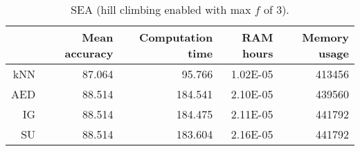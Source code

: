 \begin{table}[h]
\centering
\begin{tabular}{r|rrrr}	
    & Mean accuracy & Computation time & RAM hours & Memory usage \\ \hline
kNN & 87.064                   & 95.766           & 1.02E-05  & 413456       \\
AED & 88.514                   & 184.541          & 2.10E-05  & 439560       \\
IG  & 88.514                   & 184.475          & 2.11E-05  & 441792       \\
SU  & 88.514                   & 183.604          & 2.16E-05  & 441792      
\end{tabular}
\caption{SEA (hill climbing enabled with max $f$ of 3).}
\label{Table:SEA_H}
\end{table}